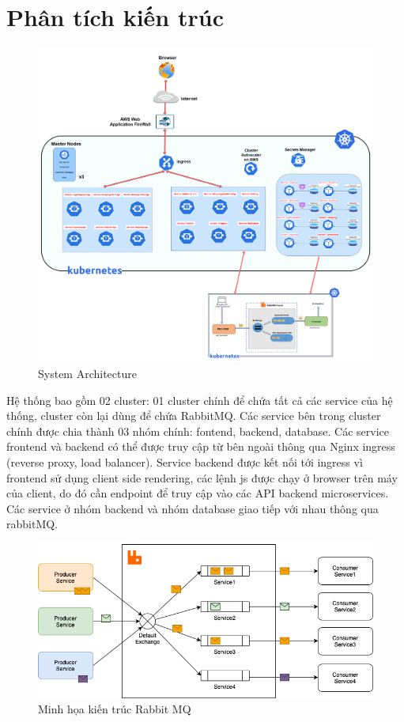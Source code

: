 \section{Phân tích kiến trúc}
 \begin{figure}[H]
    \begin{center}
    \includegraphics[scale = 0.13]{images/phat/Architech_System.png}
    \vspace*{7mm}
    \caption{System Architecture}
    \end{center}
    \label{}
\end{figure}
\noindent Hệ thống bao gồm 02 cluster: 01 cluster chính để chứa tất cả các service của hệ thống, cluster còn lại dùng để chứa RabbitMQ. Các service bên trong cluster chính được chia thành 03 nhóm chính: fontend, backend, database. Các service frontend và backend có thể được truy cập từ bên ngoài thông qua Nginx ingress (reverse proxy, load balancer). Service backend được kết nối tới ingress vì frontend sử dụng client side rendering, các lệnh js được chạy ở browser trên máy của client, do đó cần endpoint để truy cập vào các API backend microservices. Các service ở nhóm backend và nhóm database giao tiếp với nhau thông qua rabbitMQ.
\begin{figure}[H]
    \begin{center}
    \includegraphics[scale = 0.55]{images/phat/rabbitMQ.png}
    \vspace*{7mm}
    \caption{Minh họa kiến trúc Rabbit MQ}
    \end{center}
    \label{}
\end{figure}
